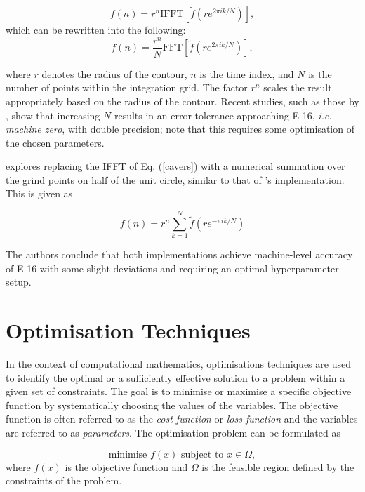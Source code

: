 \documentclass[a4paper]{report}
\begin{document}
\begin{equation}\label{cavers}
	f(n) = r^n \text{IFFT}[\tilde{f}(re^{2\pi ik / N})],
\end{equation}
which can be rewritten into the following:
\begin{equation}
		f(n) = \frac{r^n}{N} \text{FFT}[\tilde{f}(re^{2\pi ik / N})],
\end{equation}

where $r$ denotes the radius of the contour, $n$ is the time index, and $N$ is the number of points within the integration grid. The factor $r^n$ scales the result appropriately based on the radius of the contour. Recent studies, such as those by \citet{loveless2021guido}, show that increasing \(N\) results in an error tolerance approaching E-16, \textit{i.e. machine zero}, with double precision; note that this requires some optimisation of the chosen parameters. 

\citet{loveless2023phelanguido} explores replacing the IFFT of Eq. (\ref{cavers}) with a numerical summation over the grind points on half of the unit circle, similar to that of \citet{AbateWhitt1992a, AbateWhitt1992b}'s implementation. This is given as

\begin{equation}\label{equation:cavers_sum}
	f(n) = r^n \sum^{N}_{k = 1} \tilde{f}(re^{-\pi ik/N})
\end{equation}

The authors conclude that both implementations achieve machine-level accuracy of E-16 with some slight deviations and requiring an optimal hyperparameter setup.

\section{Optimisation Techniques}\label{section:optimisation_techniques}
In the context of computational mathematics, optimisations techniques are used to identify the optimal or a sufficiently effective solution to a problem within a given set of constraints. The goal is to minimise or maximise a specific objective function by systematically choosing the values of the variables. The objective function is often referred to as the \textit{cost function} or \textit{loss function} and the variables are referred to as \textit{parameters}. The optimisation problem can be formulated as

\begin{equation}\label{optimisation_problem}
	\text{minimise } f(x) \text{ subject to } x \in \Omega,
\end{equation}
where $f(x)$ is the objective function and $\Omega$ is the feasible region defined by the constraints of the problem.
\end{document}
